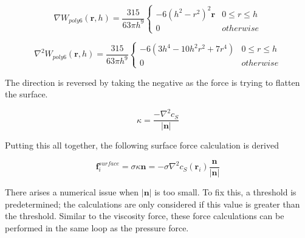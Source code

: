 \documentclass[12pt]{article}
\begin{document}
    \begin{equation}
        \nabla W_{poly6}(\textbf{r}, h) = \frac{315}{63\pi{h}^9}
        \begin{cases}
            -6(h^2-r^2)^2\textbf{r} & 0 \leq r \leq h \\
            0 & otherwise
        \end{cases}
    \end{equation}

    \begin{equation}
        \nabla^2 W_{poly6}(\textbf{r}, h) = \frac{315}{63\pi{h}^9}
        \begin{cases}
            -6(3h^4 - 10h^2r^2 + 7r^4) & 0 \leq r \leq h \\
            0 & otherwise
        \end{cases}
    \end{equation}
    
    The direction is reversed by taking the negative as the force is trying to flatten the surface.

    \begin{equation}
        \kappa = \frac{-\nabla^2 c_S}{\left|\textbf{n}\right|}
    \end{equation}

    Putting this all together, the following surface force calculation is derived

    \begin{equation}
        \textbf{f}^{surface}_{i} = \sigma \kappa \textbf{n} = -\sigma \nabla^2 c_S(\textbf{r}_i)\frac{\textbf{n}}{\left|\textbf{n}\right|}
    \end{equation}

    There arises a numerical issue when $\left|\textbf{n}\right|$ is too small. To fix this, a threshold is predetermined; the calculations are only considered if this value is greater than the threshold. Similar to the viscosity force, these force calculations can be performed in the same loop as the pressure force.
\end{document}
